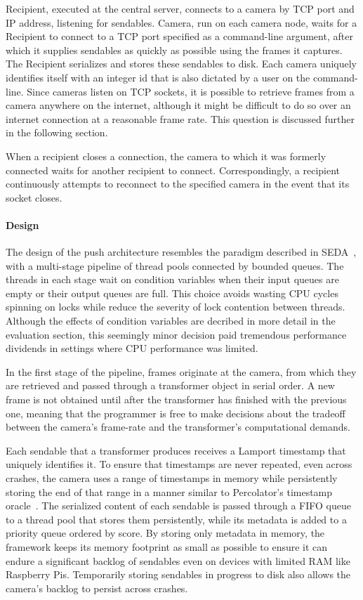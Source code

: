 Recipient, executed at the
central server, connects to a camera by TCP port and IP address, listening
for sendables.  Camera, run on each camera node, waits for a Recipient to
connect to a TCP port specified as a command-line argument, after which it
supplies sendables as quickly as possible using the frames it captures.  The
Recipient serializes and stores these sendables to disk.  Each camera uniquely
identifies itself with an integer id that is also dictated by a user on the command-line.
Since cameras listen on TCP sockets, it is possible to retrieve frames from a camera
anywhere on the internet, although it might be difficult to do so over an internet
connection at a reasonable frame rate.  This question is discussed further in the following section.

When a recipient closes a connection, the camera to which it was formerly connected
waits for another recipient to connect.  Correspondingly, a recipient continuously
attempts to reconnect to the specified camera in the event that its socket closes.


\paragraph{Design}

The design of the push architecture resembles the paradigm described in
SEDA~\cite{seda}, with a multi-stage pipeline of thread pools connected
by bounded queues. The threads in each stage wait on condition variables
when their input queues are empty or their output queues are full.  This
choice avoids wasting CPU cycles spinning on locks while reduce the severity
of lock contention between threads.  Although the effects of condition variables
are decribed in more detail in the evaluation section, this seemingly minor
decision paid tremendous performance dividends in settings where CPU
performance was limited.

In the first stage of the pipeline, frames originate at the camera, from which they
are retrieved and passed through a transformer object in serial order.  A
new frame is not obtained until after the transformer has finished with the
previous one, meaning that the programmer is free to make decisions about
the tradeoff between the camera's frame-rate and the transformer's
computational demands.

Each sendable that a transformer produces receives
a Lamport timestamp that uniquely identifies it.  To ensure that timestamps are
never repeated, even across crashes, the camera uses a range of timestamps in memory while
persistently storing the end of that range in a manner similar to Percolator's
timestamp oracle~\cite{percolator}.  The serialized content of each sendable
is passed through a FIFO queue to a thread pool that stores them persistently,
while its metadata is added to a priority queue ordered by score.  By storing only
metadata in memory, the framework keeps its memory footprint as small as possible to ensure it can
endure a significant backlog of sendables even on devices with limited RAM
like Raspberry Pis.  Temporarily storing sendables in progress to disk also allows the
camera's backlog to persist across crashes.

